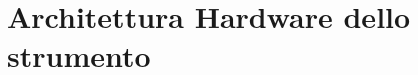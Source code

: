 \chapter{Architettura Hardware dello strumento}
\label{capitolo3}
\thispagestyle{empty}

\noindent %


